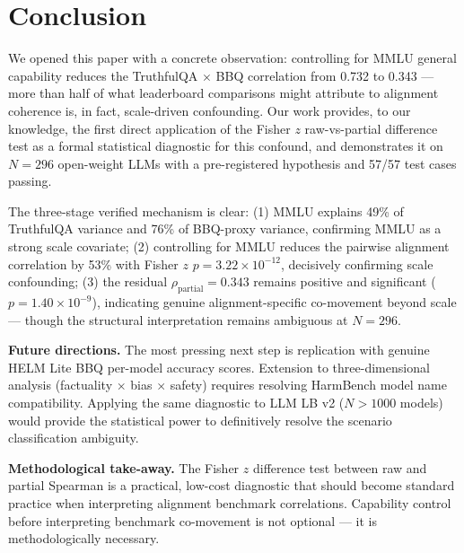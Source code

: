 \section{Conclusion}
\label{sec:conclusion}

We opened this paper with a concrete observation: controlling for MMLU general capability reduces the TruthfulQA $\times$ BBQ correlation from 0.732 to 0.343 --- more than half of what leaderboard comparisons might attribute to alignment coherence is, in fact, scale-driven confounding. Our work provides, to our knowledge, the first direct application of the Fisher $z$ raw-vs-partial difference test as a formal statistical diagnostic for this confound, and demonstrates it on $N{=}296$ open-weight LLMs with a pre-registered hypothesis and 57/57 test cases passing.

The three-stage verified mechanism is clear: (1) MMLU explains 49\% of TruthfulQA variance and 76\% of BBQ-proxy variance, confirming MMLU as a strong scale covariate; (2) controlling for MMLU reduces the pairwise alignment correlation by 53\% with Fisher $z$ $p = 3.22 \times 10^{-12}$, decisively confirming scale confounding; (3) the residual $\rho_{\text{partial}} = 0.343$ remains positive and significant ($p = 1.40 \times 10^{-9}$), indicating genuine alignment-specific co-movement beyond scale --- though the structural interpretation remains ambiguous at $N{=}296$.

\textbf{Future directions.} The most pressing next step is replication with genuine HELM Lite BBQ per-model accuracy scores. Extension to three-dimensional analysis (factuality $\times$ bias $\times$ safety) requires resolving HarmBench model name compatibility. Applying the same diagnostic to LLM LB v2 ($N > 1000$ models) would provide the statistical power to definitively resolve the scenario classification ambiguity.

\textbf{Methodological take-away.} The Fisher $z$ difference test between raw and partial Spearman is a practical, low-cost diagnostic that should become standard practice when interpreting alignment benchmark correlations. Capability control before interpreting benchmark co-movement is not optional --- it is methodologically necessary.
